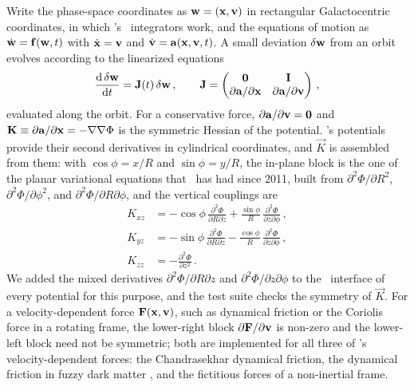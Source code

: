 Write the phase-space coordinates as $\mathbf{w} = (\mathbf{x},\mathbf{v})$ in
rectangular Galactocentric coordinates, in which \galpy's \cc\
integrators work, and the equations of motion as $\dot{\mathbf{w}} =
\mathbf{f}(\mathbf{w},t)$ with $\dot{\mathbf{x}} = \mathbf{v}$ and $\dot{\mathbf{v}} =
\mathbf{a}(\mathbf{x},\mathbf{v},t)$. A small deviation $\delta\mathbf{w}$ from an orbit
evolves according to the linearized equations
\begin{equation}\label{eq:variational}
  \frac{\mathrm{d}\,\delta\mathbf{w}}{\mathrm{d} t} = \mathbf{J}(t)\,\delta\mathbf{w}\,,\qquad
  \mathbf{J} = \begin{pmatrix} \mathbf{0} & \mathbf{I} \\
    \partial\mathbf{a}/\partial\mathbf{x} & \partial\mathbf{a}/\partial\mathbf{v}\end{pmatrix}\,,
\end{equation}
evaluated along the orbit. For a conservative force,
$\partial\mathbf{a}/\partial\mathbf{v} = \mathbf{0}$ and $\mathbf{K} \equiv
\partial\mathbf{a}/\partial\mathbf{x} = -\nabla\nabla\Phi$ is the symmetric
Hessian of the potential. \galpy's potentials provide their second
derivatives in cylindrical coordinates, and $\vec{K}$ is assembled from
them: with $\cos\phi = x/R$ and $\sin\phi = y/R$, the in-plane block is
the one of the planar variational equations that \galpy\ has had since
2011, built from $\partial^2\Phi/\partial R^2$,
$\partial^2\Phi/\partial\phi^2$, and $\partial^2\Phi/\partial R\partial\phi$,
and the vertical couplings are
\begin{align}
  K_{xz} &= -\cos\phi\,\frac{\partial^2\Phi}{\partial R\partial z}
            +\frac{\sin\phi}{R}\,\frac{\partial^2\Phi}{\partial z\partial\phi}\,,\nonumber\\
  K_{yz} &= -\sin\phi\,\frac{\partial^2\Phi}{\partial R\partial z}
            -\frac{\cos\phi}{R}\,\frac{\partial^2\Phi}{\partial z\partial\phi}\,,\\
  K_{zz} &= -\frac{\partial^2\Phi}{\partial z^2}\,.\nonumber
\end{align}
We added the mixed derivatives $\partial^2\Phi/\partial R\partial z$ and
$\partial^2\Phi/\partial z\partial\phi$ to the \cc\ interface of every
potential for this purpose, and the test suite checks the symmetry of
$\vec{K}$. For a velocity-dependent force
$\mathbf{F}(\mathbf{x},\mathbf{v})$, such as dynamical friction or the Coriolis force
in a rotating frame, the lower-right block $\partial\mathbf{F}/\partial\mathbf{v}$
is non-zero and the lower-left block need not be symmetric; both are
implemented for all three of \galpy's velocity-dependent forces: the
Chandrasekhar dynamical friction, the dynamical friction in fuzzy dark
matter \citep{Szpilfidel2026}, and the fictitious forces of a
non-inertial frame.


